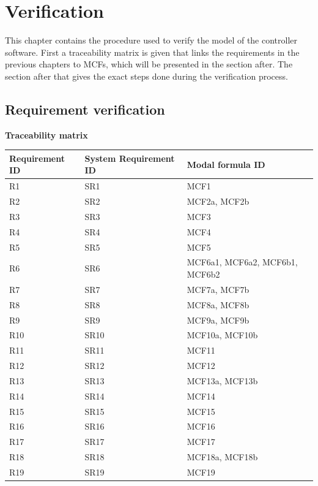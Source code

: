 \documentclass[12pt]{report}
\begin{document}
	\chapter{Verification}
	
	This chapter contains the procedure used to verify the model of the controller software. First a traceability matrix is given that links the requirements in the previous chapters to MCFs, which will be presented in the section after. The section after that gives the exact steps done during the verification process.

    \section{Requirement verification}

    \textbf{Traceability matrix}\\
    \begin{tabular}{| l | l | l | }
        \hline
        Requirement ID & System Requirement ID & Modal formula ID \\ \hline
        R1 & SR1 & MCF1 \\ \hline
        R2 & SR2 & MCF2a, MCF2b \\ \hline
        R3 & SR3 & MCF3 \\ \hline
        R4 & SR4 & MCF4 \\ \hline
        R5 & SR5 & MCF5 \\ \hline
        R6 & SR6 & MCF6a1, MCF6a2, MCF6b1, MCF6b2 \\ \hline
        R7 & SR7 & MCF7a, MCF7b \\ \hline
        R8 & SR8 & MCF8a, MCF8b \\ \hline
        R9 & SR9 & MCF9a, MCF9b \\ \hline
        R10 & SR10 & MCF10a, MCF10b \\ \hline
        R11 & SR11 & MCF11 \\ \hline
        R12 & SR12 & MCF12 \\ \hline
        R13 & SR13 & MCF13a, MCF13b \\ \hline
        R14 & SR14 & MCF14 \\ \hline
        R15 & SR15 & MCF15 \\ \hline
        R16 & SR16 & MCF16 \\ \hline
        R17 & SR17 & MCF17 \\ \hline
        R18 & SR18 & MCF18a, MCF18b \\ \hline
        R19 & SR19 & MCF19 \\  \hline
    \end{tabular}
\end{document}
